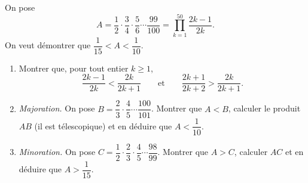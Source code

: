 On pose
\[
A = \frac12 \cdot \frac34 \cdot \frac56 \cdots \frac{99}{100}
= \prod_{k=1}^{50} \frac{2k-1}{2k}.
\]
On veut démontrer que $\dfrac{1}{15} < A < \dfrac{1}{10}$.
\begin{enumerate}
  \item Montrer que, pour tout entier $k \geqslant 1$,
  \[
  \frac{2k-1}{2k} < \frac{2k}{2k+1}
  \qquad\text{et}\qquad
  \frac{2k+1}{2k+2} > \frac{2k}{2k+1}.
  \]
  \item \emph{Majoration.} On pose
  $B = \dfrac23 \cdot \dfrac45 \cdots \dfrac{100}{101}$. Montrer que
  $A < B$, calculer le produit $AB$ (il est télescopique) et en déduire que
  $A < \dfrac{1}{10}$.
  \item \emph{Minoration.} On pose
  $C = \dfrac12 \cdot \dfrac23 \cdot \dfrac45 \cdots \dfrac{98}{99}$.
  Montrer que $A > C$, calculer $AC$ et en déduire que $A > \dfrac{1}{15}$.
\end{enumerate}
